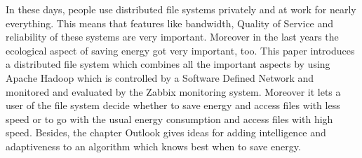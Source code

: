



In these days, people use distributed file systems privately and at work for nearly everything. This means that features like bandwidth, Quality of Service and reliability of these systems are very important. Moreover in the last years the ecological aspect of saving energy got very important, too. This paper introduces a distributed file system which combines all the important aspects by using Apache Hadoop\textsuperscript{\textregistered} which is controlled by a Software Defined Network and monitored and evaluated by the Zabbix monitoring system. Moreover it lets a user of the file system decide whether to save energy and access files with less speed or to go with the usual energy consumption and access files with high speed. Besides, the chapter Outlook gives ideas for adding intelligence and adaptiveness to an algorithm which knows best when to save energy.